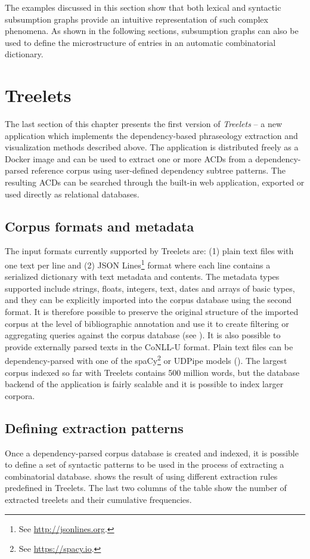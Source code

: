 \documentclass[output=paper]{langscibook}
\begin{document}
The examples discussed in this section show that both lexical and syntactic subsumption graphs provide an intuitive representation of such complex phenomena. As shown in the following sections, subsumption graphs can also be used to define the microstructure of entries in an automatic combinatorial dictionary.  

\section{Treelets}
The last section of this chapter presents the first version of \textit{Treelets} -- a new application which implements the dependency-based phraseology extraction and visualization methods described above. The application is distributed freely as a Docker image and can be used to extract one or more ACDs from a dependency-parsed reference corpus using user-defined dependency subtree patterns. The resulting ACDs can be searched through the built-in web application, exported or used directly as relational databases.

\subsection{Corpus formats and metadata}

The input formats currently supported by Treelets are: (1) plain text files with one text per line and (2) JSON Lines\footnote{See \url{http://jsonlines.org}.} format where each line contains a serialized dictionary with text metadata and contents. The metadata types supported include strings, floats, integers, text, dates and arrays of basic types, and they can be explicitly imported into the corpus database using the second format. It is therefore possible to preserve the original structure of the imported corpus at the level of bibliographic annotation and use it to create filtering or aggregating queries against the corpus database (see ). It is also possible to provide externally parsed texts in the CoNLL-U format. Plain text files can be dependency-parsed with one of the spaCy\footnote{See \url{https://spacy.io}.} or UDPipe models (\citealt{StrakaStraková2017}). The largest corpus indexed so far with Treelets contains 500 million words, but the database backend of the application is fairly scalable and it is possible to index larger corpora.

\subsection{Defining extraction patterns}\label{sec:pezik:3.2}
Once a dependency-parsed corpus database is created and indexed, it is possible to define a set of syntactic patterns to be used in the process of extracting a combinatorial database.  shows the result of using different extraction rules predefined in Treelets. The last two columns of the table show the number of extracted treelets and their cumulative frequencies. 
\end{document}
